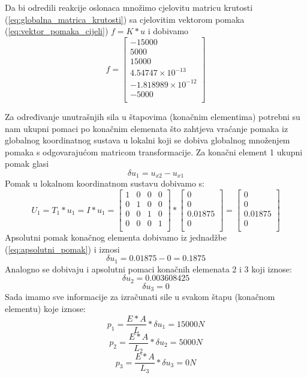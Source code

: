 \documentclass[a4paper,twoside,12pt]{memoir} %
\begin{document}
Da bi odredili reakcije oslonaca množimo cjelovitu matricu krutosti (\ref{eq:globalna_matrica_krutosti}) sa cjelovitim vektorom pomaka (\ref{eq:vektor_pomaka_cijeli}) $f = K * u$ i dobivamo
\begin{equation}
\label{eq:reakcije_oslonaca}
    f =
    \begin{bmatrix}
    -15000 \\ 
    5000 \\ 
    15000 \\ 
    4.54747 \times 10^{-13} \\ 
    -1.818989 \times 10^{-12} \\ 
    -5000 \\
    \end{bmatrix}
\end{equation}

Za određivanje unutrašnjih sila u štapovima (konačnim elementima) potrebni su nam ukupni pomaci po konačnim elemenata što zahtjeva vraćanje pomaka iz globalnog koordinatnog sustava u lokalni koji se dobiva globalnog množenjem pomaka s odgovarajućom matricom transformacije. Za konačni element 1 ukupni pomak glasi 
\begin{equation}
\label{eq:apsolutni_pomak}
\delta u_1 = u_{x2} - u_{x1}
\end{equation}
Pomak u lokalnom koordinatnom sustavu dobivamo s:
\begin{equation}
\label{eq:transformacija_u_lokalni}
    U_1 = T_1 * u_1 = I * u_1 =
    \begin{bmatrix}
    1 & 0 & 0 & 0 \\
    0 & 1 & 0 & 0 \\
    0 & 0 & 1 & 0 \\
    0 & 0 & 0 & 1 \\
    \end{bmatrix} 
    *
    \begin{bmatrix}
    0 \\ 0 \\ 0.01875 \\ 0 \\
    \end{bmatrix}
    = 
    \begin{bmatrix}
    0 \\ 0 \\ 0.01875 \\ 0 \\
    \end{bmatrix}
\end{equation}
Apsolutni pomak konačnog elementa dobivamo iz jednadžbe (\ref{eq:apsolutni_pomak}) i iznosi $$\delta u_1 = 0.01875 - 0 = 0.1875 $$
Analogno se dobivaju i apsolutni pomaci konačnih elemenata 2 i 3 koji iznose: 
$$\delta u_2 = 0.003608425$$
$$\delta u_3 = 0$$
Sada imamo sve informacije za izračunati sile u svakom štapu (konačnom elementu) koje iznose:
$$p_1 = \frac{E * A}{L} * \delta u_1 = 15000 N$$
$$p_2 = \frac{E * A}{L_2} * \delta u_2 = 5000 N$$
$$p_3 = \frac{E * A}{L_3} * \delta u_3 = 0 N $$
\end{document}
